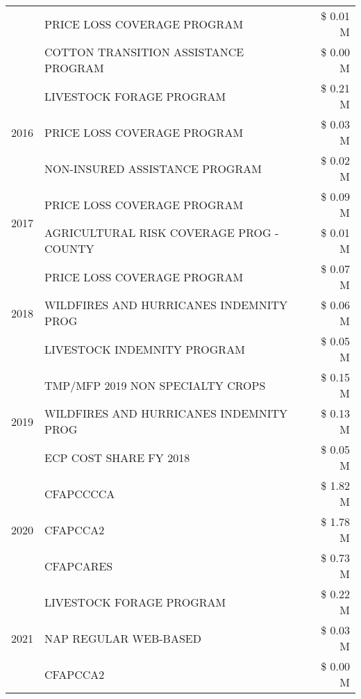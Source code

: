 \begin{tabular}{llr}
 & PRICE LOSS COVERAGE PROGRAM & \$ 0.01 M \\
 & COTTON TRANSITION ASSISTANCE PROGRAM & \$ 0.00 M \\
\cline{1-3}
\multirow[t]{3}{*}{2016} & LIVESTOCK FORAGE PROGRAM & \$ 0.21 M \\
 & PRICE LOSS COVERAGE PROGRAM & \$ 0.03 M \\
 & NON-INSURED ASSISTANCE PROGRAM & \$ 0.02 M \\
\cline{1-3}
\multirow[t]{2}{*}{2017} & PRICE LOSS COVERAGE PROGRAM & \$ 0.09 M \\
 & AGRICULTURAL RISK COVERAGE PROG - COUNTY & \$ 0.01 M \\
\cline{1-3}
\multirow[t]{3}{*}{2018} & PRICE LOSS COVERAGE PROGRAM & \$ 0.07 M \\
 & WILDFIRES AND HURRICANES INDEMNITY PROG & \$ 0.06 M \\
 & LIVESTOCK INDEMNITY PROGRAM & \$ 0.05 M \\
\cline{1-3}
\multirow[t]{3}{*}{2019} & TMP/MFP 2019 NON SPECIALTY CROPS & \$ 0.15 M \\
 & WILDFIRES AND HURRICANES INDEMNITY PROG & \$ 0.13 M \\
 & ECP COST SHARE FY 2018 & \$ 0.05 M \\
\cline{1-3}
\multirow[t]{3}{*}{2020} & CFAPCCCCA & \$ 1.82 M \\
 & CFAPCCA2 & \$ 1.78 M \\
 & CFAPCARES & \$ 0.73 M \\
\cline{1-3}
\multirow[t]{3}{*}{2021} & LIVESTOCK FORAGE PROGRAM & \$ 0.22 M \\
 & NAP REGULAR WEB-BASED & \$ 0.03 M \\
 & CFAPCCA2 & \$ 0.00 M \\
\cline{1-3}
\bottomrule
\end{tabular}
